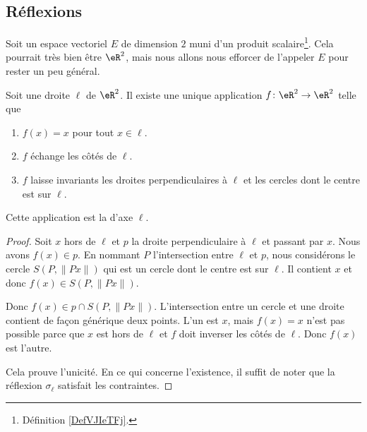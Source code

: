 \subsection{Réflexions}

Soit un espace vectoriel \( E\) de dimension \( 2\) muni d'un produit scalaire\footnote{Définition \ref{DefVJIeTFj}.}. Cela pourrait très bien être \( \eR^2\), mais nous allons nous efforcer de l'appeler \( E\) pour rester un peu général.

\begin{lemmaDef}        \label{DEFooLJKDooUaamen}
    Soit une droite \( \ell\) de \( \eR^2\). Il existe une unique application \( f\colon \eR^2\to \eR^2\) telle que
    \begin{enumerate}
        \item
            \( f(x)=x\) pour tout \( x\in \ell\).
        \item
            \( f\) échange les côtés de \( \ell\).
        \item
            \( f\) laisse invariants les droites perpendiculaires à \( \ell\) et les cercles dont le centre est sur \( \ell\).
    \end{enumerate}
    Cette application est la  d'axe \( \ell\).
\end{lemmaDef}

\begin{proof}
    Soit \( x\) hors de \( \ell\) et \( p\) la droite perpendiculaire à \( \ell\) et passant par \( x\). Nous avons \( f(x)\in p\). En nommant \( P\) l'intersection entre \( \ell\) et \( p\), nous considérons le cercle \( S(P,\| Px \|)\) qui est un cercle dont le centre est sur \( \ell\). Il contient \( x\) et donc \( f(x)\in S(P,\| Px \|)\).

    Donc \( f(x)\in p\cap S(P,\| Px \|)\). L'intersection entre un cercle et une droite contient de façon générique deux points. L'un est \( x\), mais \( f(x)=x\) n'est pas possible parce que \( x\) est hors de \( \ell\) et \( f\) doit inverser les côtés de \( \ell\). Donc \( f(x)\) est l'autre.

    Cela prouve l'unicité. En ce qui concerne l'existence, il suffit de noter que la réflexion \( \sigma_{\ell}\) satisfait les contraintes.
\end{proof}

